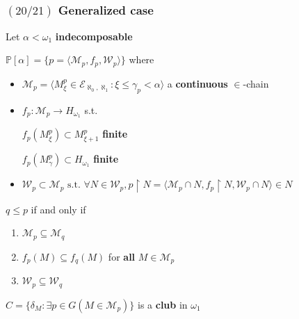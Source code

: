 \documentclass{beamer}
\newcommand{\p}{\mathds{P}}
\newcommand{\res}[2]{#1{\restriction}#2}
\newcommand{\el}[1]{\mathcal{E}_{\aleph_0, #1}}
\begin{document}
\begin{frame}
\frametitle{$(20/21)$ \hspace{15mm}Generalized case}
\begin{definition}
Let $\alpha < \omega_1$ \textbf{indecomposable}

$\p[\alpha]=\lbrace p=\langle \mathcal{M}_p, f_p, \mathcal{W}_p \rangle \rbrace$ where
\begin{itemize}
\item
$\mathcal{M}_p=\langle M^p_{\xi}\in \el{\aleph_1} \colon \xi \leq \gamma_p < \alpha \rangle$ a \textbf{continuous} $\in$-chain
\item
$f_p: \mathcal{M}_p \longrightarrow H_{\omega_1}$ s.t.

$f_p(M^p_{\xi}) \subset M^p_{\xi+1}$ \textbf{finite}

$f_p(M^p_{\gamma}) \subset H_{\omega_1}$ \textbf{finite}
\item
$\mathcal{W}_p \subset \mathcal{M}_p \text{ s.t. }\forall N \in \mathcal{W}_p,  \res{p}{N}= \langle \mathcal{M}_p \cap N, \res{f_p}{N}, \mathcal{W}_p \cap N \rangle \in N$
\end{itemize}
\end{definition}
\begin{alertblock}{}
$q \leq p$ if and only if
\begin{enumerate}
\item $\mathcal{M}_p \subseteq \mathcal{M}_q$
\item  $f_p(M) \subseteq f_q(M)$ for \textbf{all} $M \in \mathcal{M}_p$
\item  $\mathcal{W}_p \subseteq \mathcal{W}_q$
\end{enumerate}
\pause
\end{alertblock}
\vspace{-2mm}
\begin{block}{}
$C=\{\delta_M \colon \exists p \in G (M \in \mathcal{M}_p)\}$ is a \textbf{club} in $\omega_1$
\end{block}
\end{frame}
\end{document}
